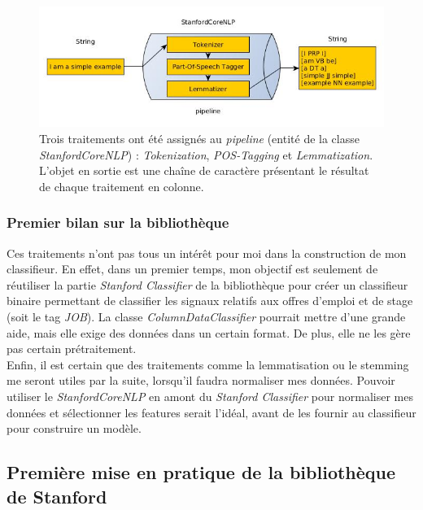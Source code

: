             \begin{figure}[h!]
                \centering
                \includegraphics[width=\textwidth]{images/coreNLP.jpg}
                \caption{Trois traitements ont été assignés au \textit{pipeline} (entité de la classe \textit{StanfordCoreNLP}) : \textit{Tokenization}, \textit{POS-Tagging} et \textit{Lemmatization}. L'objet en sortie est une chaîne de caractère présentant le résultat de chaque traitement en colonne.}
                \label{fig:coreNLP}
            \end{figure}

            \subsubsection{Premier bilan sur la bibliothèque}
                Ces traitements n'ont pas tous un intérêt pour moi dans la construction de mon classifieur. En effet, dans un premier temps, mon objectif est seulement de réutiliser la partie \textit{Stanford Classifier} de la bibliothèque pour créer un classifieur binaire permettant de classifier les signaux relatifs aux offres d'emploi et de stage (soit le tag \textit{JOB}). La classe \textit{ColumnDataClassifier} pourrait mettre d'une grande aide, mais elle exige des données dans un certain format. De plus, elle ne les gère pas certain prétraitement.\\

                Enfin, il est certain que des traitements comme la lemmatisation ou le stemming me seront utiles par la suite, lorsqu'il faudra normaliser mes données. Pouvoir utiliser le \textit{StanfordCoreNLP} en amont du \textit{Stanford Classifier} pour normaliser mes données et sélectionner les features serait l'idéal, avant de les fournir au classifieur pour construire un modèle.

        \subsection{Première mise en pratique de la bibliothèque de Stanford}
        \label{ssec:premiere_mise_en_appli}
